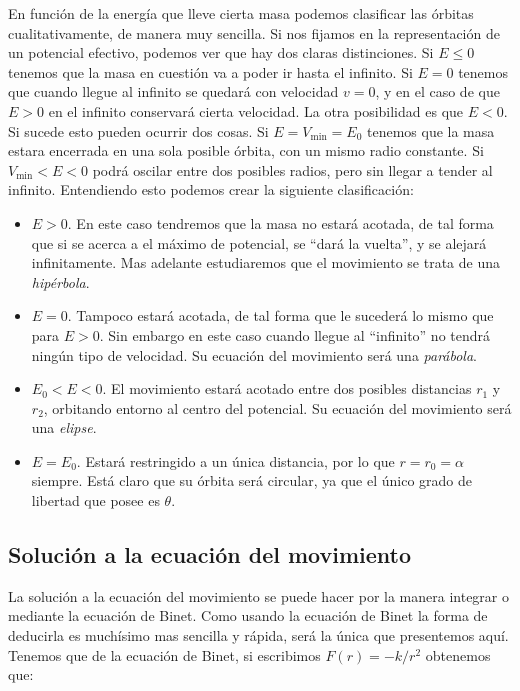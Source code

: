 \documentclass[12pt,a4paper]{book}
\begin{document}
En función de la energía que lleve cierta masa podemos clasificar las órbitas cualitativamente, de manera muy sencilla. Si nos fijamos en la representación de un potencial efectivo, podemos ver que hay dos claras distinciones. Si $E \leq 0$ tenemos que la masa en cuestión va a poder ir hasta el infinito. Si $E=0$ tenemos que cuando llegue al infinito se quedará con velocidad $v=0$, y en el caso de que $E>0$ en el infinito conservará cierta velocidad. La otra posibilidad es que $E<0$. Si sucede esto pueden ocurrir dos cosas. Si $E=V_{\mathrm{min}}=E_0$ tenemos que la masa estara encerrada en una sola posible órbita, con un mismo radio constante. Si $V_{\mathrm{min}}<E<0$ podrá oscilar entre dos posibles radios, pero sin llegar a tender al infinito. Entendiendo esto podemos crear la siguiente clasificación:

\begin{itemize}
\item $E>0$. En este caso tendremos que la masa no estará acotada, de tal forma que si se acerca a el máximo de potencial, se ``dará la vuelta'', y se alejará infinitamente. Mas adelante estudiaremos que el movimiento se trata de una \textit{hipérbola}.

\item $E=0$. Tampoco estará acotada, de tal forma que le sucederá lo mismo que para $E>0$. Sin embargo en este caso cuando llegue al ``infinito'' no tendrá ningún tipo de velocidad. Su ecuación del movimiento será una \textit{parábola}.

\item $E_0<E<0$. El movimiento estará acotado entre dos posibles distancias $r_1$ y $r_2$, orbitando entorno al centro del potencial. Su ecuación del movimiento será una \textit{elipse}.

\item $E=E_0$. Estará restringido a un única distancia, por lo que $r=r_0=\alpha$ siempre. Está claro que su órbita será circular, ya que el único grado de libertad que posee es $\theta$. 
\end{itemize}

\subsection{Solución a la ecuación del movimiento}

La solución a la ecuación del movimiento se puede hacer por la manera integrar o mediante la ecuación de Binet. Como usando la ecuación de Binet la forma de deducirla es muchísimo mas sencilla y rápida, será la única que presentemos aquí. Tenemos que de la ecuación de Binet, si escribimos $F(r) = - k/r^2$ obtenemos que:
\end{document}
